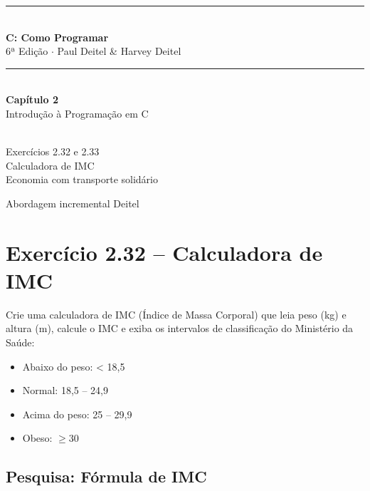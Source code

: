 \documentclass[12pt,a4paper]{article}
\begin{document}
\begin{titlepage}
  \centering\vspace*{2cm}
  {\color{deitelblue}\rule{\linewidth}{2pt}}\\[0.4cm]
  {\huge\bfseries\color{deitelblue}C: Como Programar}\\[0.2cm]
  {\large\color{deitelblue}6ª Edição $\cdot$ Paul Deitel \& Harvey Deitel}\\[0.2cm]
  {\color{deitelblue}\rule{\linewidth}{2pt}}\\[1cm]
  {\LARGE\bfseries Capítulo 2}\\[0.3cm]
  {\Large\color{deitelblue!80}Introdução à Programação em C}\\[0.8cm]
  \begin{tcolorbox}[colback=ecolightgreen,colframe=ecogreen,width=0.85\linewidth]
    \\[0.3cm]
    {\normalsize Exercícios 2.32 e 2.33\\[0.2cm]
    Calculadora de IMC\\
    Economia com transporte solidário}
  \end{tcolorbox}
  \vfill{\small Abordagem incremental Deitel}
\end{titlepage}

\tableofcontents\newpage

\section{Exercício 2.32 -- Calculadora de IMC}

\begin{enunciadoBox}[Enunciado 2.32]
Crie uma calculadora de IMC (Índice de Massa Corporal) que leia peso (kg) e
altura (m), calcule o IMC e exiba os intervalos de classificação do Ministério da
Saúde:
\begin{itemize}[noitemsep]
  \item Abaixo do peso: < 18,5
  \item Normal: 18,5 -- 24,9
  \item Acima do peso: 25 -- 29,9
  \item Obeso: $\geq 30$
\end{itemize}
\end{enunciadoBox}

\subsection*{Pesquisa: Fórmula de IMC}
\end{document}
